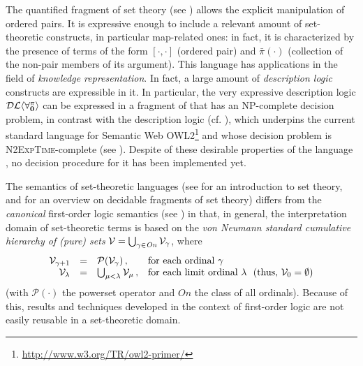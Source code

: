 \documentclass[a4paper]{llncs}
\newcommand{\nonpairssym}{\bar{\pi}}
\newcommand{\nonpairs}[1]{\nonpairssym(#1)}
\begin{document}
The quantified fragment of set theory \Forallpizero (see
\cite{CanLonNic2011}) allows the explicit manipulation of ordered
pairs.  It is expressive enough to include a relevant amount of
set-theoretic constructs, in particular map-related ones: in fact, it
is characterized by the presence of terms of the form $[\cdot,\cdot]$
(ordered pair) and $\nonpairs{\cdot}$ (collection of the non-pair
members of its argument).
%
This language has applications in the field of \emph{knowledge representation}.
In fact, a large amount of \emph{description logic} constructs
are expressible in it. In particular, the very expressive
description logic $\mathcal{DL\langle}\mathbf{\forall_{0}^{\pi}}\mathcal{\rangle}$ can be expressed
in a fragment of \Forallpizero that has an \textsc{NP}-complete
decision problem, in contrast with the description logic
\sroiq (cf. \cite{HorKutSat2006}),  which underpins the current 
standard  language for
Semantic Web OWL2\footnote{\url{http://www.w3.org/TR/owl2-primer/}} 
and whose decision problem is
\textsc{N2ExpTime}-complete (see \cite{Kaz2008}).
%
Despite of these desirable properties of the language \Forallpizero,
no decision procedure for it has been implemented yet.

The semantics of set-theoretic languages (see
\cite{Mos2005} for an introduction to set theory, and
\cite{CanFerOmo89a,CanOmoPol01,SchCanOmo11} for an overview on 
decidable fragments of set theory) differs from the \emph{canonical} 
first-order logic semantics (see \cite{Fitting96}) in that, in 
general, the interpretation domain of set-theoretic terms is based on 
the \emph{von Neumann standard
cumulative hierarchy of (pure) sets} $\mathcal{V} = \bigcup_{\gamma \in 
\mathit{On}} \mathcal{V}_{\gamma}$, where
\[
\begin{array}{rcll}
   \mathcal{V}_{\gamma+1} & = & \mathcal{P}(\mathcal{V}_\gamma) \,,
   & \textrm{for each ordinal $\gamma$}
\\
   \mathcal{V}_\lambda    & = & \bigcup_{\mu < \lambda} \mathcal{V}_\mu
   \,,& \textrm{for each limit ordinal $\lambda$~~(thus, $\mathcal{V}_0 = \emptyset$)}
\end{array}
\]
(with $\mathcal{P}(\cdot)$ the powerset operator and $\mathit{On}$
the class of all ordinals). Because of this, results
and techniques developed in the context of first-order logic are not 
easily reusable in a set-theoretic domain.
\end{document}
